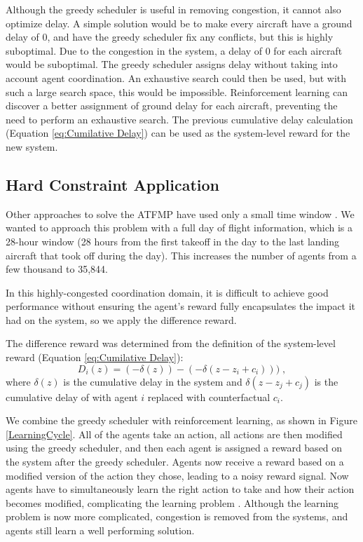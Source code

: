 \documentclass{aamas2014}
\begin{document}
Although the greedy scheduler is useful in removing congestion, it cannot also optimize delay. A simple solution would be to make every aircraft have a ground delay of 0, and have the greedy scheduler fix any conflicts, but this is highly suboptimal. Due to the congestion in the system, a delay of 0 for each aircraft would be suboptimal. The greedy scheduler assigns delay without taking into account agent coordination. An exhaustive search could then be used, but with such a large search space, this would be impossible. Reinforcement learning can discover a better assignment of ground delay for each aircraft, preventing the need to perform an exhaustive search. The previous cumulative delay calculation (Equation \ref{eq:Cumilative Delay}) can be used as the system-level reward for the new system.

\subsection{Hard Constraint Application}

Other approaches to solve the ATFMP have used only a small time window \cite{6095996}. We wanted to approach this problem with a full day of flight information, which is a 28-hour window (28 hours from the first takeoff in the day to the last landing aircraft that took off during the day). This increases the number of agents from a few thousand to 35,844. 

In this highly-congested coordination domain, it is difficult to achieve good performance without ensuring the agent's reward fully encapsulates the impact it had on the system, so we apply the difference reward. 

The difference reward was determined from the definition of the system-level reward (Equation \ref{eq:Cumilative Delay}):
%
\begin{equation}
D_i(z) = (-\delta(z)) - (-\delta(z-z_i + c_i)))\;,
\end{equation}
%
where \textit{$\delta(z)$} is the cumulative delay in the system and \textit{$\delta(z-z_j + c_j)$} is the cumulative delay of with agent $i$ replaced with counterfactual \textit{$c_i$}.

We combine the greedy scheduler with reinforcement learning, as shown in Figure \ref{LearningCycle}. All of the agents take an action, all actions are then modified using the greedy scheduler, and then each agent is assigned a reward based on the system after the greedy scheduler. Agents now receive a reward based on a modified version of the action they chose, leading to a noisy reward signal. Now agents have to simultaneously learn the right action to take and how their action becomes modified, complicating the learning problem \cite{journals/advcs/AgoginoT09}. Although the learning problem is now more complicated, congestion is removed from the systems, and agents still learn a well performing solution.
\end{document}
